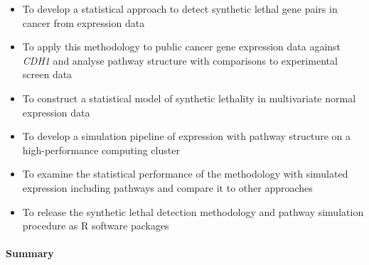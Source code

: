   \begin{itemize}
   \item To develop a statistical approach to detect synthetic lethal gene pairs in cancer from expression data

   \bigskip
   
   \item To apply this methodology to public cancer gene expression data against \textit{CDH1} and analyse pathway structure with comparisons to experimental screen data

   \bigskip
   
   \item To construct a statistical model of synthetic lethality in multivariate normal expression data
 
   \bigskip
   
   \item To develop a simulation pipeline of expression with pathway structure on a high-performance computing cluster 

   \bigskip
   
   \item To examine the statistical performance of the methodology with simulated expression including pathways and compare it to other approaches

   \bigskip
   
   \item To release the synthetic lethal detection methodology and pathway simulation procedure as R software packages
   
  \end{itemize}
  

\clearpage
  
 \paragraph{Summary}
 
